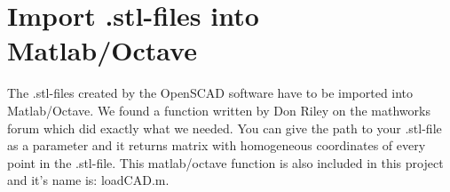 \chapter{Import .stl-files into Matlab/Octave}
The .stl-files created by the OpenSCAD software have to be imported into Matlab/Octave. We found a function written by Don Riley on the mathworks forum which did exactly what we needed.
You can give the path to your .stl-file as a parameter and it returns matrix with homogeneous coordinates of every point in the .stl-file.
This matlab/octave function is also included in this project and it's name is: loadCAD.m.